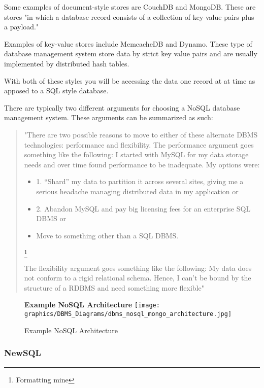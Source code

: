 \documentclass[letterpaper, 12pt]{article}
\begin{document}
Some examples of document-style stores are CouchDB and MongoDB. These are stores 
"in which a database record consists of a collection of key-value pairs plus a payload."
\cite{stonebraker2010sql}
\par\vspace{\baselineskip}
Examples of key-value stores include MemcacheDB and Dynamo. These type of database 
management system store data by strict key value pairs and are usually implemented by 
distributed hash tables.
\par\vspace{\baselineskip}
With both of these styles you will be accessing the data one record at 
at time as apposed to a SQL style database.
\par\vspace{\baselineskip}
There are typically two different arguments for choosing a NoSQL database management 
system. These arguments can be summarized as such:

\begin{quote}
"There are two possible reasons
to move to either of these alternate
DBMS technologies: performance and
flexibility.
The performance argument goes
something like the following: I started
with MySQL for my data storage needs
and over time found performance to be
inadequate. My options were:

\begin{itemize}
  \item 1. “Shard” my data to partition it
across several sites, giving me a serious
headache managing distributed data
in my application or
  \item 2. Abandon MySQL and pay big licensing
fees for an enterprise SQL
DBMS or 
\item Move to something other
than a SQL DBMS.
\end{itemize}\footnote{Formatting mine}

The flexibility argument goes something
like the following: My data does
not conform to a rigid relational schema.
Hence, I can’t be bound by the
structure of a RDBMS and need something
more flexible"
\end{quote} \cite{stonebraker2010sql}

\begin{figure}
  \centering
  \textbf{Example NoSQL Architecture}
  \texttt{[image: graphics/DBMS\_Diagrams/dbms\_nosql\_mongo\_architecture.jpg]}
  \caption{Example NoSQL Architecture}
\end{figure}

\subsubsection{NewSQL}
\end{document}
